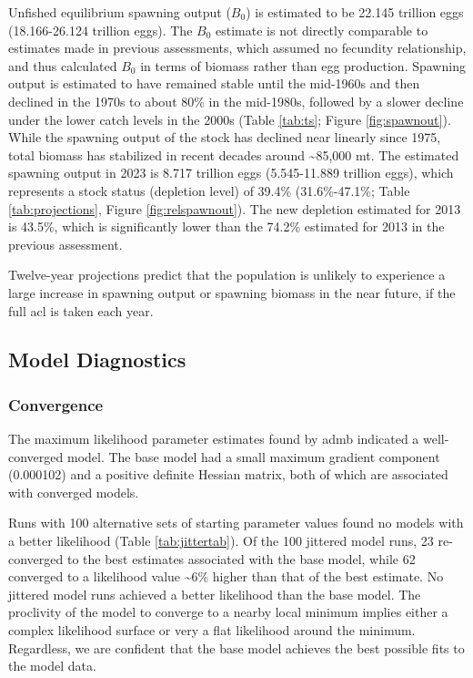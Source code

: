 \documentclass[11pt,
  english,
  letterpaper,
]{article}
\begin{document}
Unfished equilibrium spawning output (\(B_0\)) is estimated to be 22.145 trillion eggs (18.166-26.124 trillion eggs). The \(B_0\) estimate is not directly comparable to estimates made in previous assessments, which assumed no fecundity relationship, and thus calculated \(B_0\) in terms of biomass rather than egg production. Spawning output is estimated to have remained stable until the mid-1960s and then declined in the 1970s to about 80\% in the mid-1980s, followed by a slower decline under the lower catch levels in the 2000s (Table \ref{tab:ts}; Figure \ref{fig:spawnout}). While the spawning output of the stock has declined near linearly since 1975, total biomass has stabilized in recent decades around \textasciitilde85,000 mt. The estimated spawning output in 2023 is 8.717 trillion eggs (5.545-11.889 trillion eggs), which represents a stock status (depletion level) of 39.4\% (31.6\%-47.1\%; Table \ref{tab:projections}, Figure \ref{fig:relspawnout}). The new depletion estimated for 2013 is 43.5\%, which is significantly lower than the 74.2\% estimated for 2013 in the previous assessment.

Twelve-year projections predict that the population is unlikely to experience a large increase in spawning output or spawning biomass in the near future, if the full \gls{acl} is taken each year.

\hypertarget{model-diagnostics}{%
\subsection{Model Diagnostics}\label{model-diagnostics}}

\hypertarget{convergence}{%
\subsubsection{Convergence}\label{convergence}}

The maximum likelihood parameter estimates found by \gls{admb} indicated a well-converged model. The base model had a small maximum gradient component (0.000102) and a positive definite Hessian matrix, both of which are associated with converged models.

Runs with 100 alternative sets of starting parameter values found no models with a better likelihood (Table \ref{tab:jittertab}). Of the 100 jittered model runs, 23 re-converged to the best estimates associated with the base model, while 62 converged to a likelihood value \textasciitilde6\% higher than that of the best estimate. No jittered model runs achieved a better likelihood than the base model. The proclivity of the model to converge to a nearby local minimum implies either a complex likelihood surface or very a flat likelihood around the minimum. Regardless, we are confident that the base model achieves the best possible fits to the model data.
\end{document}

